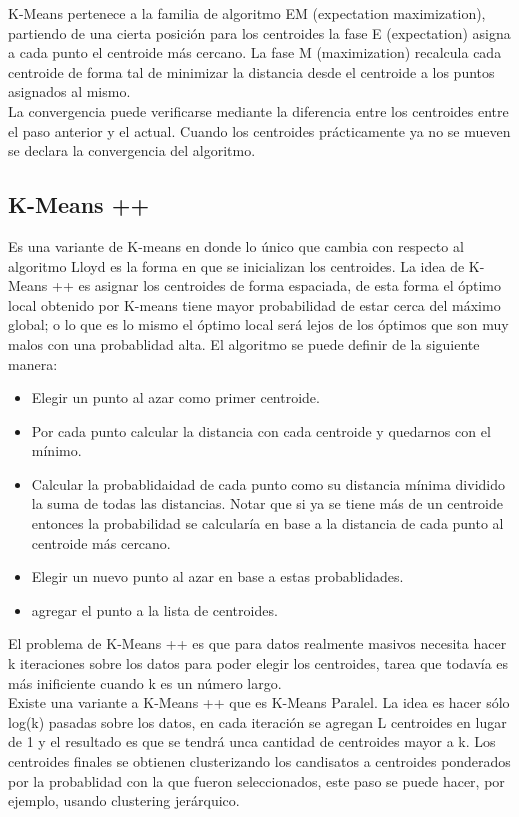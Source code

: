\documentclass[titlepage,a4paper]{article}
\begin{document}
K-Means pertenece a la familia de algoritmo EM (expectation maximization), partiendo de una cierta posición  para los centroides la fase E (expectation) asigna a cada punto el centroide más cercano. La fase M (maximization) recalcula cada centroide de forma tal de minimizar la distancia desde el centroide a los puntos asignados al mismo. \\

La convergencia puede verificarse mediante la diferencia entre los centroides entre el paso anterior y el actual. Cuando los centroides prácticamente ya no se mueven  se declara la convergencia del algoritmo. 

\subsection*{K-Means ++}
Es una variante de K-means en donde lo único que cambia con respecto al algoritmo Lloyd es la forma en que se inicializan los centroides.  La idea de K-Means ++ es asignar los centroides de forma espaciada, de esta forma el óptimo local obtenido por K-means tiene mayor probabilidad de estar cerca del máximo global; o lo que es lo mismo el óptimo local será lejos de los óptimos que son muy malos con una probablidad alta. El algoritmo se puede definir de la siguiente manera: 
\begin{itemize}
\item  Elegir un punto al azar como primer centroide. 
\item Por cada punto calcular la distancia con cada centroide y quedarnos con el mínimo. 
\item Calcular la probablidaidad de cada punto como su distancia mínima dividido la suma de todas las distancias. Notar que si ya se tiene más de un centroide entonces la probabilidad se calcularía en base a la distancia de cada punto al centroide más cercano. 
\item Elegir un nuevo punto al azar en base a estas probablidades. 
\item agregar el punto a la lista de centroides. 
\end{itemize}

El problema de K-Means ++ es que para datos realmente masivos necesita hacer k iteraciones sobre los datos para poder elegir los centroides, tarea que todavía es más inificiente cuando k es un número largo. \\

Existe una variante a K-Means ++ que es K-Means Paralel. La idea es hacer sólo log(k) pasadas sobre los datos, en cada iteración se agregan L centroides en lugar de 1 y el resultado es que se tendrá unca cantidad de centroides mayor a k. Los centroides finales se obtienen clusterizando los candisatos a centroides ponderados por la probablidad con la que fueron seleccionados, este paso se puede hacer, por ejemplo, usando clustering jerárquico. \\
\end{document}

